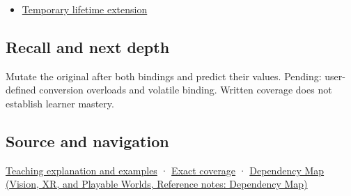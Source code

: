 \hypertarget{appendix-37856d997bb0-used-by}{}

\begin{itemize}
\tightlist
\item
  \hyperref[appendix-a978b29bbbb0]{Temporary lifetime extension}
\end{itemize}

\subsection{Recall and next depth}\label{appendix-37856d997bb0-recall-and-next-depth}

\hypertarget{appendix-37856d997bb0-recall-and-next-depth}{}

Mutate the original after both bindings and predict their values. Pending: user-defined conversion overloads and volatile binding. Written coverage does not establish learner mastery.

\subsection{Source and navigation}\label{appendix-37856d997bb0-source-and-navigation}

\hypertarget{appendix-37856d997bb0-source-and-navigation}{}

\hyperref[01-foundations-i-ch003-binding-chooses-a-referent-not-always-the-one-you-imagined]{Teaching explanation and examples} · \hyperref[appendix-fd090d982a15-m008---parts-113-126]{Exact coverage} · \href{../07-Vision-XR-and-Playable-Worlds/main.pdf\#nameddest=appendix-4ad47bdd269a}{Dependency Map (Vision, XR, and Playable Worlds, Reference notes: Dependency Map)}
